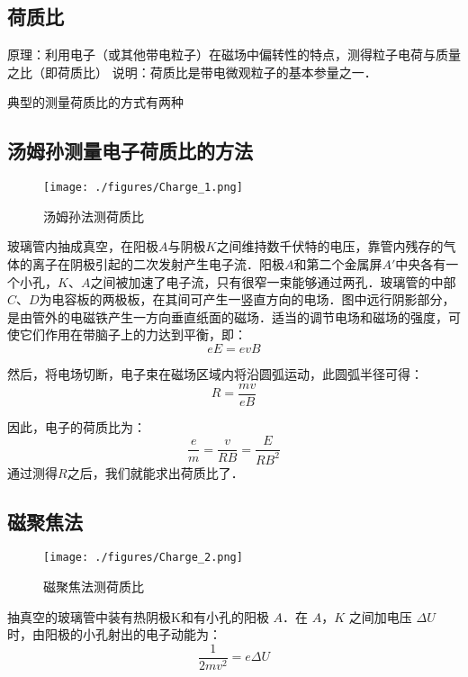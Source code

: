 
\subsection{荷质比}
原理：利用电子（或其他带电粒子）在磁场中偏转性的特点，测得粒子电荷与质量之比（即荷质比）
说明：荷质比是带电微观粒子的基本参量之一．

典型的测量荷质比的方式有两种

\subsection{汤姆孙测量电子荷质比的方法}

\begin{figure}[ht]
\centering
\texttt{[image: ./figures/Charge\_1.png]}
\caption{汤姆孙法测荷质比} \label{Charge_fig1}
\end{figure}

玻璃管内抽成真空，在阳极$A$与阴极$K$之间维持数千伏特的电压，靠管内残存的气体的离子在阴极引起的二次发射产生电子流．阳极$A$和第二个金属屏$A'$中央各有一个小孔，$K$、$A$之间被加速了电子流，只有很窄一束能够通过两孔．玻璃管的中部$C$、$D$为电容板的两极板，在其间可产生一竖直方向的电场．图中远行阴影部分，是由管外的电磁铁产生一方向垂直纸面的磁场．适当的调节电场和磁场的强度，可使它们作用在带脑子上的力达到平衡，即：
\begin{equation}
eE=evB
\end{equation}

然后，将电场切断，电子束在磁场区域内将沿圆弧运动，此圆弧半径可得：
\begin{equation}
R=\frac {mv}{eB}
\end{equation}

因此，电子的荷质比为：
\begin{equation}
\frac{e}{m}=\frac{v}{RB}=\frac {E}{RB^2}
\end{equation}
通过测得$R$之后，我们就能求出荷质比了．

\subsection{磁聚焦法}

\begin{figure}[ht]
\centering
\texttt{[image: ./figures/Charge\_2.png]}
\caption{磁聚焦法测荷质比} \label{Charge_fig2}
\end{figure}

抽真空的玻璃管中装有热阴极K和有小孔的阳极 $A$．在 $A$，$K$ 之间加电压 $\Delta U$ 时，由阳极的小孔射出的电子动能为：
\begin{equation}
\frac{1}{2mv^2}=e\Delta U
\end{equation}

